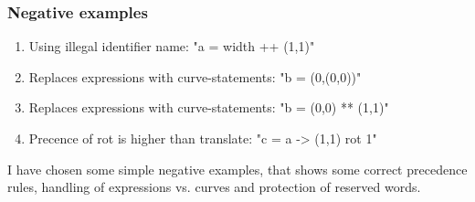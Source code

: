 \documentclass[a4paper, 10pt]{article}
\begin{document}
\subsubsection*{Negative examples}
\begin{enumerate}
    \item Using illegal identifier name: "a = width ++ (1,1)"
    \item Replaces expressions with curve-statements: "b = (0,(0,0))"
    \item Replaces expressions with curve-statements: "b = (0,0) ** (1,1)"
    \item Precence of rot is higher than translate: "c = a -> (1,1) rot 1"
\end{enumerate}

I have chosen some simple negative examples, that shows some correct precedence rules, handling of expressions vs. curves and protection of reserved words.
\end{document}
